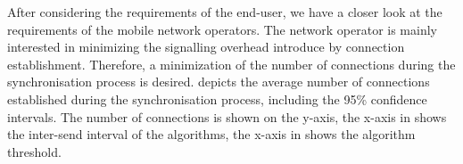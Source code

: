 After considering the requirements of the end-user, we have a closer look at the requirements of the mobile network operators.
The network operator is mainly interested in minimizing the signalling overhead introduce by connection establishment.
Therefore, a minimization of the number of connections \connectionCount during the synchronisation process is desired.
 depicts the average number of connections \connectionCount established during the synchronisation process, including the 95\% confidence intervals.
The number of connections is shown on the y-axis, the x-axis in  shows the inter-send interval of the \algointerval algorithms, the x-axis in  shows the \algosize algorithm threshold.


